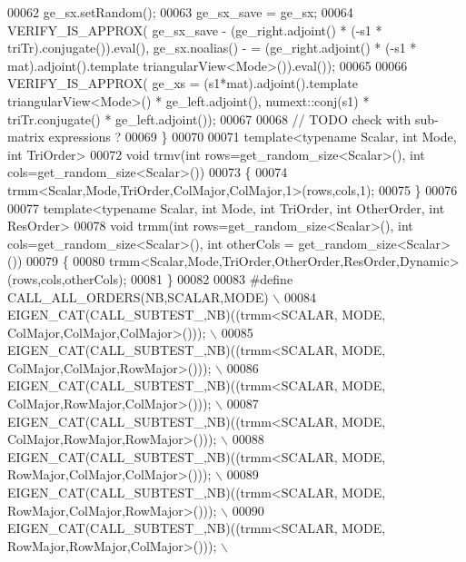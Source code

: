 \begin{DoxyCode}
00062   ge\_sx.setRandom();
00063   ge\_sx\_save = ge\_sx;
00064   VERIFY\_IS\_APPROX( ge\_sx\_save - (ge\_right.adjoint() * (-s1 * triTr).conjugate()).eval(), ge\_sx.noalias() -
      = (ge\_right.adjoint() * (-s1 * mat).adjoint().template triangularView<Mode>()).eval());
00065   
00066   VERIFY\_IS\_APPROX( ge\_xs = (s1*mat).adjoint().\textcolor{keyword}{template} triangularView<Mode>() * ge\_left.adjoint(), 
      numext::conj(s1) * triTr.conjugate() * ge\_left.adjoint());
00067   
00068   \textcolor{comment}{// TODO check with sub-matrix expressions ?}
00069 \}
00070 
00071 \textcolor{keyword}{template}<\textcolor{keyword}{typename} Scalar, \textcolor{keywordtype}{int} Mode, \textcolor{keywordtype}{int} TriOrder>
00072 \textcolor{keywordtype}{void} trmv(\textcolor{keywordtype}{int} rows=get\_random\_size<Scalar>(), \textcolor{keywordtype}{int} cols=get\_random\_size<Scalar>())
00073 \{
00074   trmm<Scalar,Mode,TriOrder,ColMajor,ColMajor,1>(rows,cols,1);
00075 \}
00076 
00077 \textcolor{keyword}{template}<\textcolor{keyword}{typename} Scalar, \textcolor{keywordtype}{int} Mode, \textcolor{keywordtype}{int} TriOrder, \textcolor{keywordtype}{int} OtherOrder, \textcolor{keywordtype}{int} ResOrder>
00078 \textcolor{keywordtype}{void} trmm(\textcolor{keywordtype}{int} rows=get\_random\_size<Scalar>(), \textcolor{keywordtype}{int} cols=get\_random\_size<Scalar>(), \textcolor{keywordtype}{int} otherCols = 
      get\_random\_size<Scalar>())
00079 \{
00080   trmm<Scalar,Mode,TriOrder,OtherOrder,ResOrder,Dynamic>(rows,cols,otherCols);
00081 \}
00082 
00083 \textcolor{preprocessor}{#define CALL\_ALL\_ORDERS(NB,SCALAR,MODE)                                             \(\backslash\)}
00084 \textcolor{preprocessor}{  EIGEN\_CAT(CALL\_SUBTEST\_,NB)((trmm<SCALAR, MODE, ColMajor,ColMajor,ColMajor>()));  \(\backslash\)}
00085 \textcolor{preprocessor}{  EIGEN\_CAT(CALL\_SUBTEST\_,NB)((trmm<SCALAR, MODE, ColMajor,ColMajor,RowMajor>()));  \(\backslash\)}
00086 \textcolor{preprocessor}{  EIGEN\_CAT(CALL\_SUBTEST\_,NB)((trmm<SCALAR, MODE, ColMajor,RowMajor,ColMajor>()));  \(\backslash\)}
00087 \textcolor{preprocessor}{  EIGEN\_CAT(CALL\_SUBTEST\_,NB)((trmm<SCALAR, MODE, ColMajor,RowMajor,RowMajor>()));  \(\backslash\)}
00088 \textcolor{preprocessor}{  EIGEN\_CAT(CALL\_SUBTEST\_,NB)((trmm<SCALAR, MODE, RowMajor,ColMajor,ColMajor>()));  \(\backslash\)}
00089 \textcolor{preprocessor}{  EIGEN\_CAT(CALL\_SUBTEST\_,NB)((trmm<SCALAR, MODE, RowMajor,ColMajor,RowMajor>()));  \(\backslash\)}
00090 \textcolor{preprocessor}{  EIGEN\_CAT(CALL\_SUBTEST\_,NB)((trmm<SCALAR, MODE, RowMajor,RowMajor,ColMajor>()));  \(\backslash\)}

\end{DoxyCode}
